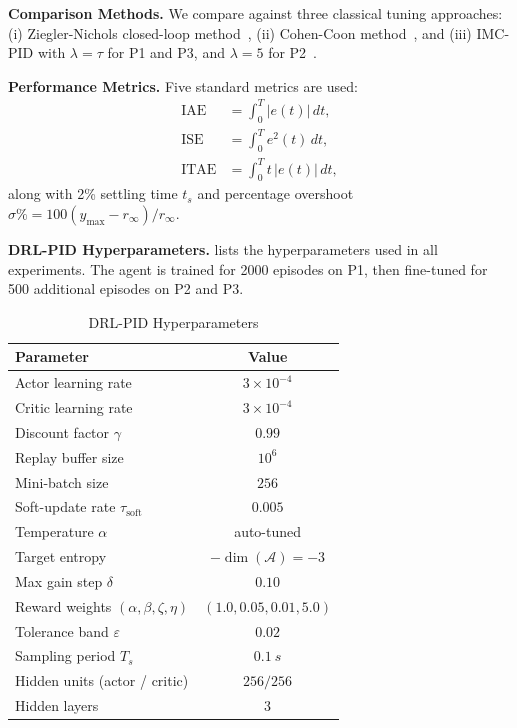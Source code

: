 \documentclass[conference,a4paper]{IEEEtran}[2015/08/26]
\newcommand{\calA}{\mathcal{A}}
\begin{document}
\textbf{Comparison Methods.}
We compare against three classical tuning approaches:
(i) Ziegler-Nichols closed-loop method~\cite{Ziegler1942},
(ii) Cohen-Coon method~\cite{Cohen1953}, and
(iii) IMC-PID with $\lambda = \tau$ for P1 and P3, and $\lambda = 5$
for P2~\cite{Rivera1986}.

\textbf{Performance Metrics.}
Five standard metrics are used:
\begin{align}
  \text{IAE} &= \int_0^T |e(t)|\,dt, \label{eq:iae}\\
  \text{ISE} &= \int_0^T e^2(t)\,dt, \label{eq:ise}\\
  \text{ITAE} &= \int_0^T t\,|e(t)|\,dt, \label{eq:itae}
\end{align}
along with 2\% settling time $t_s$ and percentage overshoot
$\sigma\% = 100(y_{\max} - r_{\infty})/r_{\infty}$.

\textbf{DRL-PID Hyperparameters.}
 lists the hyperparameters used in all experiments.
The agent is trained for 2000 episodes on P1, then fine-tuned for
500 additional episodes on P2 and P3.

\begin{table}[t]
  \caption{DRL-PID Hyperparameters}
  \label{tab:hyper}
  \centering
  \begin{tabular}{lc}
    \toprule
    Parameter & Value \\
    \midrule
    Actor learning rate & $3 \times 10^{-4}$ \\
    Critic learning rate & $3 \times 10^{-4}$ \\
    Discount factor $\gamma$ & $0.99$ \\
    Replay buffer size & $10^6$ \\
    Mini-batch size & $256$ \\
    Soft-update rate $\tau_{\text{soft}}$ & $0.005$ \\
    Temperature $\alpha$ & auto-tuned \\
    Target entropy & $-\dim(\calA) = -3$ \\
    Max gain step $\delta$ & $0.10$ \\
    Reward weights $(\alpha, \beta, \zeta, \eta)$ & $(1.0, 0.05, 0.01, 5.0)$ \\
    Tolerance band $\varepsilon$ & $0.02$ \\
    Sampling period $T_s$ & $\SI{0.1}{s}$ \\
    Hidden units (actor / critic) & $256 / 256$ \\
    Hidden layers & $3$ \\
    \bottomrule
  \end{tabular}
\end{table}
\end{document}
